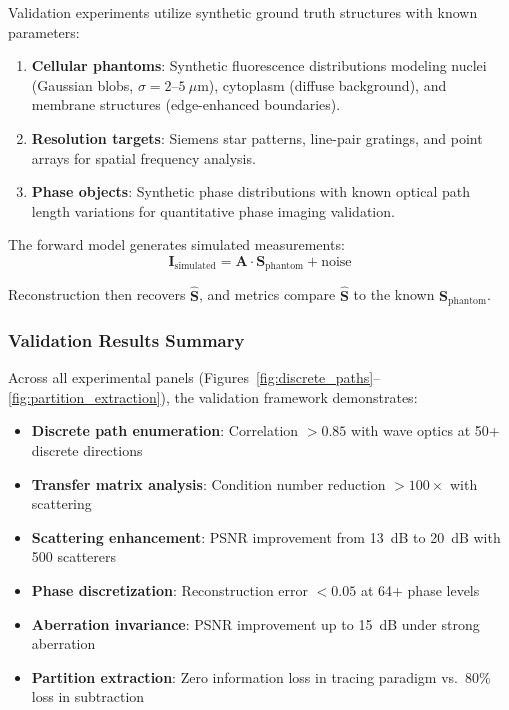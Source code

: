 \documentclass[twocolumn,10pt,a4paper]{article}
\begin{document}
Validation experiments utilize synthetic ground truth structures with known parameters:

\begin{enumerate}
    \item \textbf{Cellular phantoms}: Synthetic fluorescence distributions modeling nuclei (Gaussian blobs, $\sigma = 2$--$5~\mu$m), cytoplasm (diffuse background), and membrane structures (edge-enhanced boundaries).

    \item \textbf{Resolution targets}: Siemens star patterns, line-pair gratings, and point arrays for spatial frequency analysis.

    \item \textbf{Phase objects}: Synthetic phase distributions with known optical path length variations for quantitative phase imaging validation.
\end{enumerate}

The forward model generates simulated measurements:
\begin{equation}
\mathbf{I}_{\text{simulated}} = \mathbf{A} \cdot \mathbf{S}_{\text{phantom}} + \text{noise}
\end{equation}

Reconstruction then recovers $\hat{\mathbf{S}}$, and metrics compare $\hat{\mathbf{S}}$ to the known $\mathbf{S}_{\text{phantom}}$.

\subsubsection{Validation Results Summary}

Across all experimental panels (Figures~\ref{fig:discrete_paths}--\ref{fig:partition_extraction}), the validation framework demonstrates:

\begin{itemize}
    \item \textbf{Discrete path enumeration}: Correlation $> 0.85$ with wave optics at 50+ discrete directions
    \item \textbf{Transfer matrix analysis}: Condition number reduction $> 100\times$ with scattering
    \item \textbf{Scattering enhancement}: PSNR improvement from 13~dB to 20~dB with 500 scatterers
    \item \textbf{Phase discretization}: Reconstruction error $< 0.05$ at 64+ phase levels
    \item \textbf{Aberration invariance}: PSNR improvement up to 15~dB under strong aberration
    \item \textbf{Partition extraction}: Zero information loss in tracing paradigm vs.\ 80\% loss in subtraction
\end{itemize}
\end{document}
